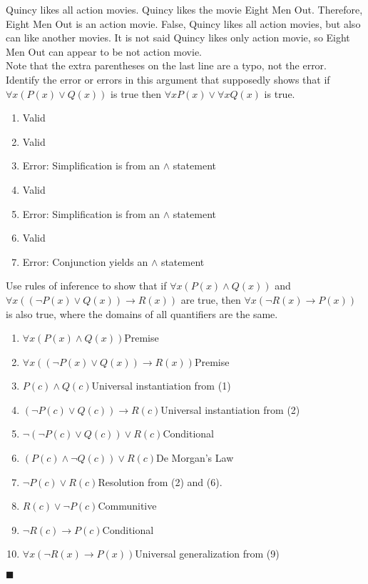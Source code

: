 \documentclass[12pt]{article}  %
\newcommand{\AND}{\wedge}
\newcommand{\OR}{\vee}
\newcommand{\IMPLIES}{\rightarrow}
\begin{document}
\newline
Quincy likes all action movies. Quincy likes the movie Eight Men Out. Therefore, Eight Men Out is an action movie.\newline
False, Quincy likes all action movies, but also can like another movies. It is not said Quincy likes only action movie, so Eight Men Out can appear to be not action movie.
\clearpage
{}
\\ Note that the extra parentheses on the last line are a typo, not the error.\\
Identify the error or errors in this argument that supposedly shows that if $\forall x(P(x)\OR Q(x))$ is true then $\forall xP(x)\OR \forall xQ(x)$ is true.
\begin{enumerate}
    \item Valid
    \item Valid
    \item Error: Simplification is from an $\AND$ statement
    \item Valid
    \item Error: Simplification is from an $\AND$ statement
    \item Valid
    \item Error: Conjunction yields an $\AND$ statement
\end{enumerate}

Use rules of inference to show that if $\forall x(P(x)\AND{Q(x)})$ and $\forall x((\neg{P(x)}\OR{Q(x)})\to{R(x)})$ are true, then $\forall x(\neg{R(x)}\IMPLIES{P(x)})$ is also true, where the domains of all quantifiers are the same.
\begin{enumerate}
    \item $\forall x(P(x)\AND{Q(x)})$\hspace{30mm}Premise
    \item $\forall x((\neg{P(x)}\OR{Q(x)})\to{R(x)})$\hspace{9mm}Premise
    \item $P(c)\AND{Q(c)}$\hspace{39mm}Universal instantiation from (1)
    \item $(\neg{P(c)}\OR{Q(c)})\to{R(c)}$\hspace{18mm}Universal instantiation from (2)
    \item $\neg{(\neg{P(c)}\OR{Q(c)})}\OR{R(c)}$\hspace{17mm}Conditional
    \item $(P(c)\AND{\neg{Q(c)}})\OR{R(c)}$\hspace{20mm}De Morgan's Law
    \item $\neg{P(c)\OR{R(c)}}$\hspace{36mm}Resolution from (2) and (6).
    \item $R(c)\OR{\neg{P(c)}}$\hspace{36mm}Communitive
    \item $\neg{R(c)}\to{P(c)}$\hspace{34mm}Conditional
    \item $\forall x(\neg{R(x)\to{P(x)}})$\hspace{25mm}Universal generalization from (9)
\end{enumerate}
$\blacksquare$
\clearpage
\end{document}
